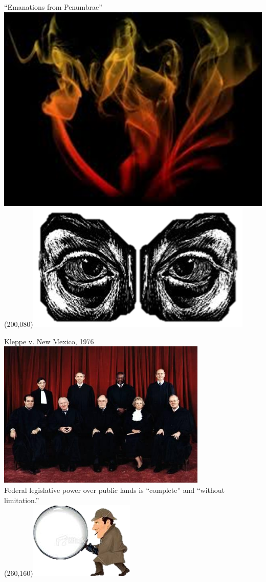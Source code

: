 \begin{frame}{``Emanations from Penumbrae''}
   \centering
   \includegraphics[height=.7\textheight]{img/fire.png} \\
   \Put(200,080){\includegraphics[width=.4\textwidth]{img/eyes.png}}
\end{frame}

\begin{frame}{Kleppe v. New Mexico, 1976}
    \centering
    \includegraphics[width=0.75\textwidth]{img/sc-1976.png} \\
    { \large Federal legislative power over public lands is ``complete'' and
    ``without limitation.'' \\ }
    \Put(260,160){\includegraphics[width=.2\textwidth]{img/sherlock.png}}
\end{frame}

